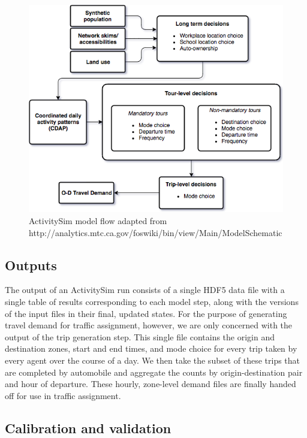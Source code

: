  
\begin{figure}[ht]
    \center
    \includegraphics[width=\textwidth]{graphics/asim_flow.png}
    \caption{ActivitySim model flow adapted from http://analytics.mtc.ca.gov/foswiki/bin/view/Main/ModelSchematic}
    \label{fig:asim-models}
\end{figure}

\subsection{Outputs}

The output of an ActivitySim run consists of a single HDF5 data file with a single table of results corresponding to each model step, along with the versions of the input files in their final, updated states. For the purpose of generating travel demand for traffic assignment, however, we are only concerned with the output of the trip generation step. This single file contains the origin and destination zones, start and end times, and mode choice for every trip taken by every agent over the course of a day. We then take the subset of these trips that are completed by automobile and aggregate the counts by origin-destination pair and hour of departure. These hourly, zone-level demand files are finally handed off for use in traffic assignment.

\subsection{Calibration and validation}

